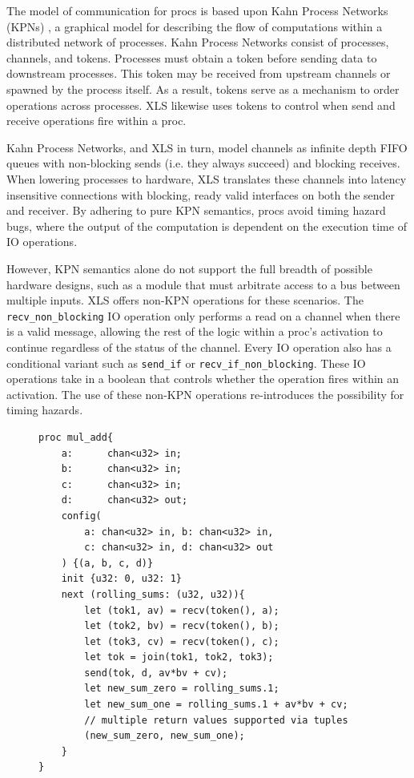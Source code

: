 The model of communication for procs is based upon Kahn Process Networks (KPNs) \cite{kahnprocessnetwork}, a graphical model for describing the flow of computations within a distributed network of processes. Kahn Process Networks consist of processes, channels, and tokens. Processes must obtain a token before sending data to downstream processes. This token may be received from upstream channels or spawned by the process itself. As a result, tokens serve as a mechanism to order operations across processes. XLS likewise uses tokens to control when send and receive operations fire within a proc.

Kahn Process Networks, and XLS in turn, model channels as infinite depth FIFO queues with non-blocking sends (i.e. they always succeed) and blocking receives. When lowering processes to hardware, XLS translates these channels into latency insensitive connections with blocking, ready valid interfaces on both the sender and receiver. By adhering to pure KPN semantics, procs avoid timing hazard bugs, where the output of the computation is dependent on the execution time of IO operations. 

However, KPN semantics alone do not support the full breadth of possible hardware designs, such as a module that must arbitrate access to a bus between multiple inputs. XLS offers non-KPN operations for these scenarios. The \lstinline[style=mystyle]|recv_non_blocking| IO operation only performs a read on a channel when there is a valid message, allowing the rest of the logic within a proc's activation to continue regardless of the status of the channel. Every IO operation also has a conditional variant such as \lstinline[style=mystyle]|send_if| or \lstinline[style=mystyle]|recv_if_non_blocking|. These IO operations take in a boolean that controls whether the operation fires within an activation. The use of these non-KPN operations re-introduces the possibility for timing hazards.

\begin{figure}[ht]
\begin{lstlisting}[label={simpleproc}, caption=An example proc. join() produces a new token useful for ordering IO operations \textit{after} all the tokens in its parameter list. Procs can hold state across activations., captionpos=b, style=mystyle]
proc mul_add{
    a:      chan<u32> in;
    b:      chan<u32> in;
    c:      chan<u32> in;
    d:      chan<u32> out;
    config(
        a: chan<u32> in, b: chan<u32> in,
        c: chan<u32> in, d: chan<u32> out
    ) {(a, b, c, d)}
    init {u32: 0, u32: 1}
    next (rolling_sums: (u32, u32)){
        let (tok1, av) = recv(token(), a);
        let (tok2, bv) = recv(token(), b);
        let (tok3, cv) = recv(token(), c);
        let tok = join(tok1, tok2, tok3);
        send(tok, d, av*bv + cv);
        let new_sum_zero = rolling_sums.1;
        let new_sum_one = rolling_sums.1 + av*bv + cv;
        // multiple return values supported via tuples
        (new_sum_zero, new_sum_one);
    }
}
\end{lstlisting}
\end{figure}

